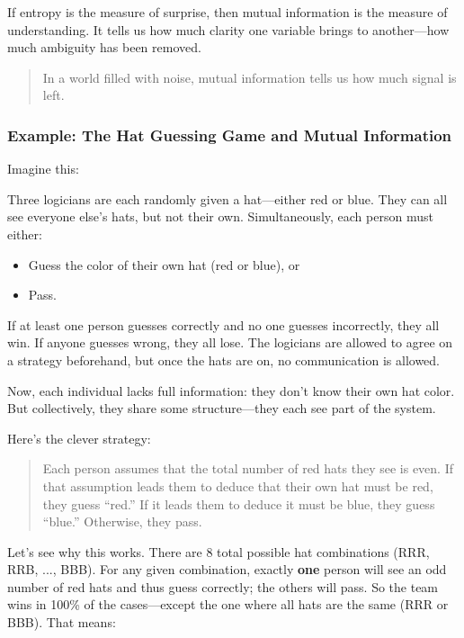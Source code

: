 If entropy is the measure of surprise, then mutual information is the measure of understanding. It tells us how much clarity one variable brings to another—how much ambiguity has been removed.

\begin{quote}
In a world filled with noise, mutual information tells us how much signal is left.
\end{quote}

\vspace{1em}
\subsubsection{Example: The Hat Guessing Game and Mutual Information}

Imagine this:

Three logicians are each randomly given a hat—either red or blue. They can all see everyone else’s hats, but not their own. Simultaneously, each person must either:

\begin{itemize}
  \item Guess the color of their own hat (red or blue), or
  \item Pass.
\end{itemize}

If at least one person guesses correctly and no one guesses incorrectly, they all win. If anyone guesses wrong, they all lose. The logicians are allowed to agree on a strategy beforehand, but once the hats are on, no communication is allowed.

Now, each individual lacks full information: they don’t know their own hat color. But collectively, they share some structure—they each see part of the system.

Here’s the clever strategy:

\begin{quote}
Each person assumes that the total number of red hats they see is even. If that assumption leads them to deduce that their own hat must be red, they guess “red.” If it leads them to deduce it must be blue, they guess “blue.” Otherwise, they pass.
\end{quote}

Let’s see why this works. There are 8 total possible hat combinations (RRR, RRB, ..., BBB). For any given combination, exactly \textbf{one} person will see an odd number of red hats and thus guess correctly; the others will pass. So the team wins in 100\% of the cases—except the one where all hats are the same (RRR or BBB). That means:

